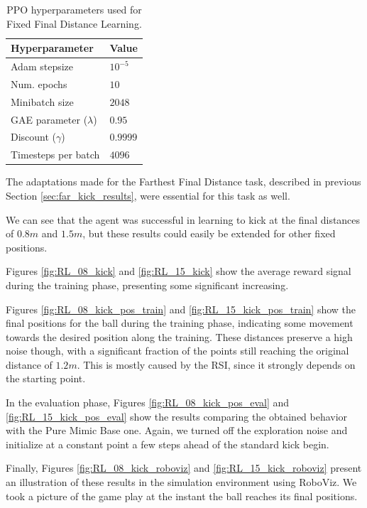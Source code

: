 \begin{table}[ht]
    \begin{tabular}{|l|l|}
    \hline
    Hyperparameter            & Value    \\  \hline
    Adam stepsize             & $10^{-5}$ \\
    Num. epochs               & $10$     \\
    Minibatch size            & $2048$     \\
    GAE parameter ($\lambda$) & $0.95$   \\
    Discount ($\gamma$)       & $0.9999$ \\
    Timesteps per batch       & $4096$   \\ \hline
    \end{tabular}
\centering
\caption{PPO hyperparameters used for Fixed Final Distance Learning.}
\label{tab:fix_kick}
\end{table}

The adaptations made for the Farthest Final Distance task, described in previous Section \ref{sec:far_kick_results}, were essential for this task as well.

We can see that the agent was successful in learning to kick at the final distances of $0.8m$ and $1.5m$, but these results could easily be extended for other fixed positions.

Figures \ref{fig:RL_08_kick} and \ref{fig:RL_15_kick} show the average reward signal during the training phase, presenting some significant increasing.

Figures \ref{fig:RL_08_kick_pos_train} and \ref{fig:RL_15_kick_pos_train} show the final positions for the ball during the training phase, indicating some movement towards the desired position along the training. These distances preserve a high noise though, with a significant fraction of the points still reaching the original distance of $1.2m$. This is mostly caused by the RSI, since it strongly depends on the starting point.

In the evaluation phase, Figures \ref{fig:RL_08_kick_pos_eval} and \ref{fig:RL_15_kick_pos_eval} show the results comparing the obtained behavior with the Pure Mimic Base one. Again, we turned off the exploration noise and initialize at a constant point a few steps ahead of the standard kick begin.

Finally, Figures \ref{fig:RL_08_kick_roboviz} and \ref{fig:RL_15_kick_roboviz} present an illustration of these results in the simulation environment using RoboViz. We took a picture of the game play at the instant the ball reaches its final positions.

